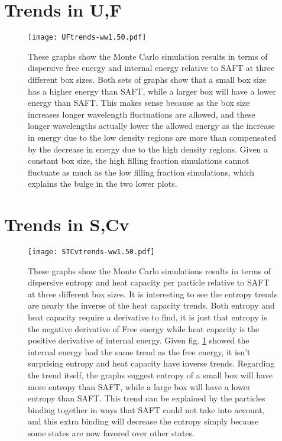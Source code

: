 \section{Trends in U,F}
\begin{figure}[h]
\vspace*{-10mm}
\hspace*{-6mm}
	\centering
	\texttt{[image: UFtrends-ww1.50.pdf]}
	\caption{
	\scriptsize
	These graphs show the Monte Carlo simulation results in terms of dispersive free energy and internal energy relative to SAFT at three different box sizes. Both sets of graphs show that a small box size has a higher energy than SAFT, while a larger box will have a lower energy than SAFT. This makes sense because as the box size increases longer wavelength fluctuations are allowed, and these longer wavelengths actually lower the allowed energy as the increase in energy due to the low density regions are more than compensated by the decrease in energy due to the high density regions. Given a constant box size, the high filling fraction simulations cannot fluctuate as much as the low filling fraction simulations, which explains the bulge in the two lower plots.}
	\label{fig:UFtrends}
\end{figure}


\pagebreak
\section{Trends in S,Cv}
\begin{figure}[h]
\vspace*{-40mm}
\hspace*{-6mm}
	\centering
	\texttt{[image: STCvtrends-ww1.50.pdf]}
	\caption{\scriptsize
	These graphs show the Monte Carlo simulations results in terms of dispersive entropy and heat capacity per particle relative to SAFT at three different box sizes. It is interesting to see the entropy trends are nearly the inverse of the heat capacity trends. Both entropy and heat capacity require a derivative to find, it is just that entropy is the negative derivative of Free energy while heat capacity is the positive derivative of internal energy. Given fig. \ref{fig:UFtrends} showed the internal energy had the same trend as the free energy, it isn't surprising entropy and heat capacity have inverse trends. Regarding the trend itself, the graphs suggest entropy of a small box will have more entropy than SAFT, while a large box will have a lower entropy than SAFT. This trend can be explained by the particles binding together in ways that SAFT could not take into account, and this extra binding will decrease the entropy simply because some states are now favored over other states.}
	\label{fig:STCvtrends}
\end{figure}



